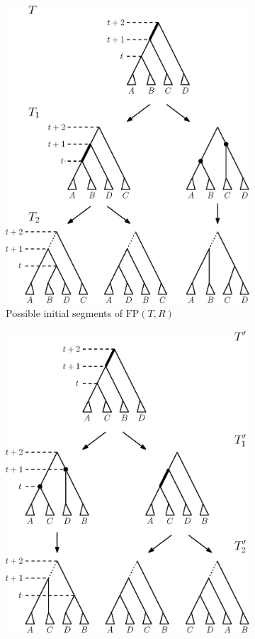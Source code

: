 \documentclass[11pt]{amsart}
\newcommand{\fp}{\mathrm{FP}}
\begin{document}
\begin{enumerate}[label = 1.{\arabic*}]
\begin{figure}[H]
	\begin{subfigure}[b]{.45\textwidth}
		\centering
		\includegraphics[width=0.9\linewidth]{thm_fp_nni2a.eps}
		\vspace{12pt}
		\caption{Possible initial segments of $\fp(T, R)$}
		\label{fig:thm_fp_nni2a}
	\end{subfigure}
	\begin{subfigure}[b]{.45\textwidth}
		\centering
		\includegraphics[width=0.9\linewidth]{thm_fp_nni2b.eps}

\end{subfigure}
\end{figure}
\end{enumerate}
\end{document}
